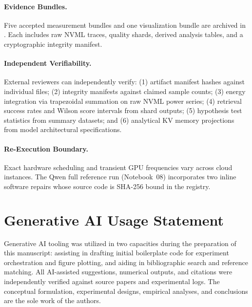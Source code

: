 \documentclass[sigconf,nonacm]{acmart}
\begin{document}
\paragraph{Evidence Bundles.}
Five accepted measurement bundles and one visualization bundle are archived in
. Each includes raw NVML traces, quality shards, derived
analysis tables, and a cryptographic integrity manifest.

\paragraph{Independent Verifiability.}
External reviewers can independently verify:
(1) artifact manifest hashes against individual files;
(2) integrity manifests against claimed sample counts;
(3) energy integration via trapezoidal summation on raw NVML power series;
(4) retrieval success rates and Wilson score intervals from shard outputs;
(5) hypothesis test statistics from summary datasets; and
(6) analytical KV memory projections from model architectural specifications.

\paragraph{Re-Execution Boundary.}
Exact hardware scheduling and transient GPU frequencies vary across cloud instances. The Qwen full reference run (Notebook~08) incorporates two inline software repairs whose source code is SHA-256 bound in the registry.

\section*{Generative AI Usage Statement}

Generative AI tooling was utilized in two capacities during the preparation of this manuscript: assisting in drafting initial boilerplate code for experiment orchestration and figure plotting, and aiding in bibliographic search and reference matching. All AI-assisted suggestions, numerical outputs, and citations were independently verified against source papers and experimental logs. The conceptual formulation, experimental designs, empirical analyses, and conclusions are the sole work of the authors.


\begingroup
\sloppy
{}

\endgroup
\end{document}
